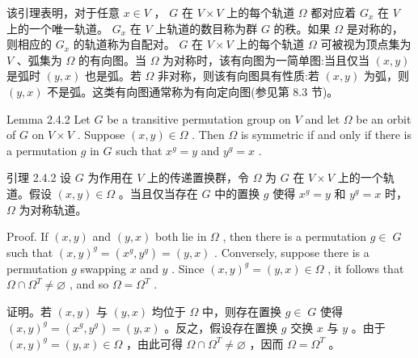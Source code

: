 \documentclass[10pt]{article}
\begin{document}
\begin{tcolorbox}\relax
该引理表明，对于任意 \(x \in  V\) ， \(G\) 在 \(V \times  V\) 上的每个轨道 \(\Omega\) 都对应着 \({G}_{x}\) 在 \(V\) 上的一个唯一轨道。 \({G}_{x}\) 在 \(V\) 上轨道的数目称为群 \(G\) 的秩。如果 \(\Omega\) 是对称的，则相应的 \({G}_{x}\) 的轨道称为自配对。 \(G\) 在 \(V \times  V\) 上的每个轨道 \(\Omega\) 可被视为顶点集为 \(V\) 、弧集为 \(\Omega\) 的有向图。当 \(\Omega\) 为对称时，该有向图为一简单图:当且仅当 \(\left( {x,y}\right)\) 是弧时 \(\left( {y,x}\right)\) 也是弧。若 \(\Omega\) 非对称，则该有向图具有性质:若 \(\left( {x,y}\right)\) 为弧，则 \(\left( {y,x}\right)\) 不是弧。这类有向图通常称为有向定向图(参见第 8.3 节)。
\end{tcolorbox}

Lemma 2.4.2 Let \(G\) be a transitive permutation group on \(V\) and let \(\Omega\) be an orbit of \(G\) on \(V \times  V\) . Suppose \(\left( {x,y}\right)  \in  \Omega\) . Then \(\Omega\) is symmetric if and only if there is a permutation \(g\) in \(G\) such that \({x}^{g} = y\) and \({y}^{g} = x\) .

\begin{tcolorbox}\relax
引理 2.4.2 设 \(G\) 为作用在 \(V\) 上的传递置换群，令 \(\Omega\) 为 \(G\) 在 \(V \times  V\) 上的一个轨道。假设 \(\left( {x,y}\right)  \in  \Omega\) 。当且仅当存在 \(G\) 中的置换 \(g\) 使得 \({x}^{g} = y\) 和 \({y}^{g} = x\) 时， \(\Omega\) 为对称轨道。
\end{tcolorbox}

Proof. If \(\left( {x,y}\right)\) and \(\left( {y,x}\right)\) both lie in \(\Omega\) , then there is a permutation \(g \in \; G\) such that \({\left( x,y\right) }^{g} = \left( {{x}^{g},{y}^{g}}\right)  = \left( {y,x}\right)\) . Conversely, suppose there is a permutation \(g\) swapping \(x\) and \(y\) . Since \({\left( x,y\right) }^{g} = \left( {y,x}\right)  \in  \Omega\) , it follows that \(\Omega  \cap  {\Omega }^{T} \neq  \varnothing\) , and so \(\Omega  = {\Omega }^{T}\) .

\begin{tcolorbox}\relax
证明。若 \(\left( {x,y}\right)\) 与 \(\left( {y,x}\right)\) 均位于 \(\Omega\) 中，则存在置换 \(g \in \; G\) 使得 \({\left( x,y\right) }^{g} = \left( {{x}^{g},{y}^{g}}\right)  = \left( {y,x}\right)\) 。反之，假设存在置换 \(g\) 交换 \(x\) 与 \(y\) 。由于 \({\left( x,y\right) }^{g} = \left( {y,x}\right)  \in  \Omega\) ，由此可得 \(\Omega  \cap  {\Omega }^{T} \neq  \varnothing\) ，因而 \(\Omega  = {\Omega }^{T}\) 。
\end{tcolorbox}
\end{document}
